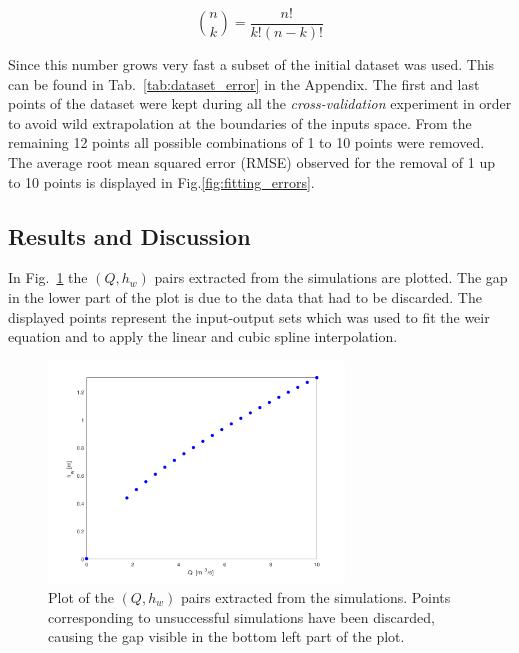 \begin{equation}
  \binom{n}{k} = \frac{n!}{k!\left(n-k\right)!}
\end{equation}

\noindent Since this number grows very fast a subset of the initial dataset was used.
This can be found in Tab.~\ref{tab:dataset_error} in the Appendix.
The first and last points of the dataset were kept during all the \emph{cross-validation} experiment in order to avoid wild extrapolation at the boundaries of the inputs space.
From the remaining \num{12} points all possible combinations of \num{1} to \num{10} points were removed.
The average root mean squared error (RMSE) observed for the removal of \num{1} up to \num{10} points is displayed in Fig.\ref{fig:fitting_errors}.

\subsection{Results and Discussion}


In Fig.~\ref{fig:simulations_results} the $(Q, h_w)$ pairs extracted from the simulations are plotted.
The gap in the lower part of the plot is due to the data that had to be discarded.
The displayed points represent the input-output sets which was used to fit the weir equation and to apply the  linear and cubic spline interpolation.

\begin{figure}[h]
  \centering
  \includegraphics[width=0.7\textwidth]{Figures/simulations_results.png}
  \caption{Plot of the $(Q, h_w)$ pairs extracted from the simulations. Points corresponding to unsuccessful simulations have been discarded, causing the gap visible in the bottom left part of the plot.}
  \label{fig:simulations_results}
\end{figure}

